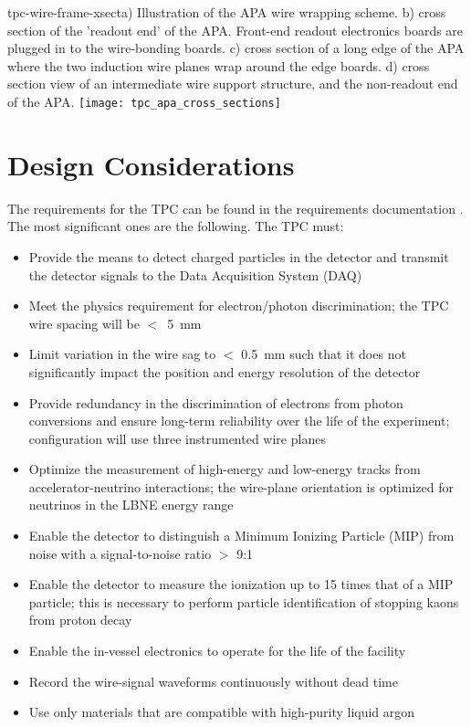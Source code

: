 \begin{cdrfigure}{tpc-wire-frame-xsect}{a) Illustration of the APA wire wrapping scheme. b) cross section of the 'readout end' of the APA.  Front-end readout electronics boards are plugged in to the wire-bonding boards.  c) cross section of a long edge of the APA where the two induction wire planes wrap around the edge boards.  d) cross section view of an intermediate wire support structure, and the non-readout end of the APA.}
\texttt{[image: tpc\_apa\_cross\_sections]}
\end{cdrfigure}


\section{Design Considerations} 
\label{sec:v5-tpc-reqs-n-specs}

The requirements for the TPC can be found in the requirements documentation \cite{lar-fd-req}. The most significant ones are the following. The TPC must:

\begin{itemize}	
\item Provide the means to detect charged particles in the detector and transmit the detector signals to the Data Acquisition System (DAQ)
\item Meet the physics requirement for electron/photon discrimination;  the TPC wire spacing will be $<$~5~mm
\item Limit variation in the wire sag to $<$ 0.5~mm such that it does not significantly impact the position and energy resolution of the detector
\item Provide redundancy in the discrimination of electrons from photon conversions and ensure long-term reliability over the life of the experiment;  configuration will use three instrumented wire planes
\item Optimize the measurement of high-energy and low-energy tracks from accelerator-neutrino interactions; the wire-plane orientation is optimized for neutrinos in the LBNE energy range
\item Enable the detector to distinguish a Minimum Ionizing Particle (MIP) from noise with a signal-to-noise ratio $>$ 9:1
\item Enable the detector to measure the ionization up to 15 times that of a MIP particle; this is necessary to perform particle identification of stopping kaons from proton decay
\item Enable the in-vessel electronics to operate for the life of the facility
\item Record the wire-signal waveforms continuously without dead time
\item Use only materials that are compatible with high-purity liquid argon

\end{itemize}

